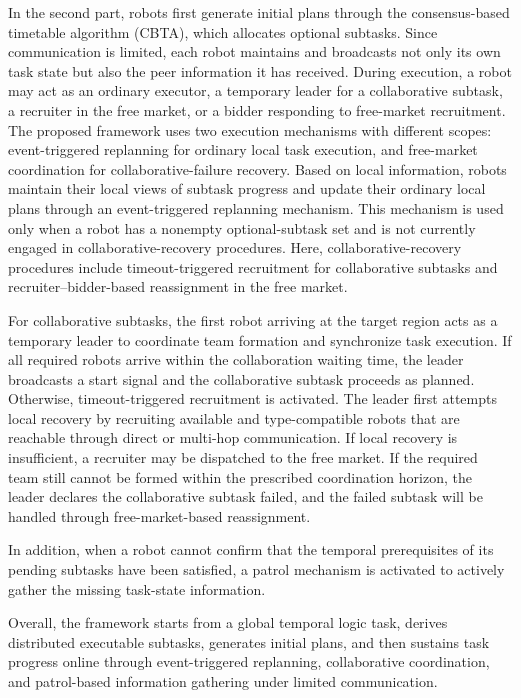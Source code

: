 \documentclass[lettersize,journal]{IEEEtran}
\begin{document}
In the second part, robots first generate initial plans through the consensus-based timetable algorithm (CBTA), which allocates optional subtasks. Since communication is limited, each robot maintains and broadcasts not only its own task state but also the peer information it has received. During execution, a robot may act as an ordinary executor, a temporary leader for a collaborative subtask, a recruiter in the free market, or a bidder responding to free-market recruitment. The proposed framework uses two execution mechanisms with different scopes: event-triggered replanning for ordinary local task execution, and free-market coordination for collaborative-failure recovery. Based on local information, robots maintain their local views of subtask progress and update their ordinary local plans through an event-triggered replanning mechanism. This mechanism is used only when a robot has a nonempty optional-subtask set and is not currently engaged in collaborative-recovery procedures. Here, collaborative-recovery procedures include timeout-triggered recruitment for collaborative subtasks and recruiter--bidder-based reassignment in the free market.

For collaborative subtasks, the first robot arriving at the target region acts as a temporary leader to coordinate team formation and synchronize task execution. If all required robots arrive within the collaboration waiting time, the leader broadcasts a start signal and the collaborative subtask proceeds as planned. Otherwise, timeout-triggered recruitment is activated. The leader first attempts local recovery by recruiting available and type-compatible robots that are reachable through direct or multi-hop communication. If local recovery is insufficient, a recruiter may be dispatched to the free market. If the required team still cannot be formed within the prescribed coordination horizon, the leader declares the collaborative subtask failed, and the failed subtask will be handled through free-market-based reassignment.

In addition, when a robot cannot confirm that the temporal prerequisites of its pending subtasks have been satisfied, a patrol mechanism is activated to actively gather the missing task-state information. 

Overall, the framework starts from a global temporal logic task, derives distributed executable subtasks, generates initial plans, and then sustains task progress online through event-triggered replanning, collaborative coordination, and patrol-based information gathering under limited communication.
\end{document}
